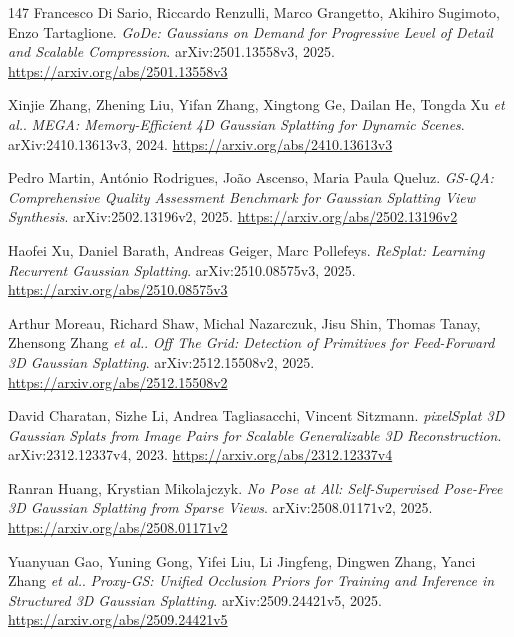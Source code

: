 \documentclass[11pt,a4paper]{article}
\begin{document}
\begin{thebibliography}{147}
Francesco Di Sario, Riccardo Renzulli, Marco Grangetto, Akihiro Sugimoto, Enzo Tartaglione.
\newblock \emph{GoDe: Gaussians on Demand for Progressive Level of Detail and Scalable Compression}.
\newblock arXiv:2501.13558v3, 2025.
\newblock \url{https://arxiv.org/abs/2501.13558v3}

Xinjie Zhang, Zhening Liu, Yifan Zhang, Xingtong Ge, Dailan He, Tongda Xu \emph{et al.}.
\newblock \emph{MEGA: Memory-Efficient 4D Gaussian Splatting for Dynamic Scenes}.
\newblock arXiv:2410.13613v3, 2024.
\newblock \url{https://arxiv.org/abs/2410.13613v3}

Pedro Martin, Ant\'{o}nio Rodrigues, Jo\~{a}o Ascenso, Maria Paula Queluz.
\newblock \emph{GS-QA: Comprehensive Quality Assessment Benchmark for Gaussian Splatting View Synthesis}.
\newblock arXiv:2502.13196v2, 2025.
\newblock \url{https://arxiv.org/abs/2502.13196v2}

Haofei Xu, Daniel Barath, Andreas Geiger, Marc Pollefeys.
\newblock \emph{ReSplat: Learning Recurrent Gaussian Splatting}.
\newblock arXiv:2510.08575v3, 2025.
\newblock \url{https://arxiv.org/abs/2510.08575v3}

Arthur Moreau, Richard Shaw, Michal Nazarczuk, Jisu Shin, Thomas Tanay, Zhensong Zhang \emph{et al.}.
\newblock \emph{Off The Grid: Detection of Primitives for Feed-Forward 3D Gaussian Splatting}.
\newblock arXiv:2512.15508v2, 2025.
\newblock \url{https://arxiv.org/abs/2512.15508v2}

David Charatan, Sizhe Li, Andrea Tagliasacchi, Vincent Sitzmann.
\newblock \emph{pixelSplat 3D Gaussian Splats from Image Pairs for Scalable Generalizable 3D Reconstruction}.
\newblock arXiv:2312.12337v4, 2023.
\newblock \url{https://arxiv.org/abs/2312.12337v4}

Ranran Huang, Krystian Mikolajczyk.
\newblock \emph{No Pose at All: Self-Supervised Pose-Free 3D Gaussian Splatting from Sparse Views}.
\newblock arXiv:2508.01171v2, 2025.
\newblock \url{https://arxiv.org/abs/2508.01171v2}

Yuanyuan Gao, Yuning Gong, Yifei Liu, Li Jingfeng, Dingwen Zhang, Yanci Zhang \emph{et al.}.
\newblock \emph{Proxy-GS: Unified Occlusion Priors for Training and Inference in Structured 3D Gaussian Splatting}.
\newblock arXiv:2509.24421v5, 2025.
\newblock \url{https://arxiv.org/abs/2509.24421v5}


\end{thebibliography}
\end{document}
